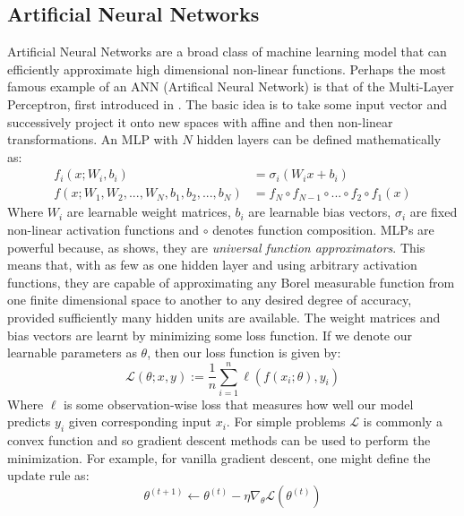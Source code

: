 \subsection{Artificial Neural Networks}
Artificial Neural Networks are a broad class of machine learning model that can efficiently approximate
high dimensional non-linear functions. Perhaps the most famous example of an ANN (Artifical Neural Network)
is that of the Multi-Layer Perceptron, first introduced in \cite{ROSENBLATT1958}. The basic idea is to take some input
vector and successively project it onto new spaces with affine and then non-linear transformations.
An MLP with $N$ hidden layers can be defined mathematically as:
\begin{equation}
    \begin{aligned}
        f_i(x; W_i, b_i) &= \sigma_i(W_i x + b_i) \\
        f(x; W_1, W_2, ..., W_N, b_1, b_2, ..., b_N) &= f_N \circ f_{N-1} \circ ... \circ f_2 \circ f_1(x)
    \end{aligned}
\end{equation}
Where $W_i$  are learnable weight matrices, $b_i$ are learnable bias vectors, $\sigma_i$ are fixed non-linear activation functions and $\circ$ denotes function composition.
MLPs are powerful because, as \cite{HORNIK1989} shows, they are \textit{universal function approximators}.
This means that, with as few as one hidden layer and using arbitrary activation functions, 
they are capable of approximating any Borel measurable function from one finite dimensional space 
to another to any desired degree of accuracy, provided sufficiently many hidden units are available.
The weight matrices and bias vectors are learnt by minimizing some loss function.
If we denote our learnable parameters as $\theta$, then our loss function is given by:
\begin{equation}
   \mathcal{L} (\theta; x, y) := \frac{1}{n} \sum_{i=1}^{n} \ell(f(x_i; \theta), y_i)
\end{equation}
Where $\ell$ is some observation-wise loss that measures how well our model predicts
$y_i$ given corresponding input $x_i$.
For simple problems $\mathcal{L}$ is commonly a convex function and so gradient descent methods can be
used to perform the minimization. For example, for vanilla gradient descent, one might define the update rule as:
\begin{equation}
    \theta^{(t+1)} \gets \theta^{(t)} - \eta \nabla_\theta \mathcal{L}(\theta^{(t)})
\end{equation}
